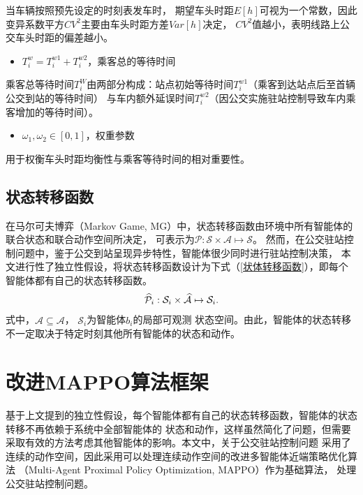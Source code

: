 当车辆按照预先设定的时刻表发车时，
期望车头时距$E[h]$可视为一个常数，因此变异系数平方$CV^2$主要由车头时距方差$Var[h]$决定，
$CV^2$值越小，表明线路上公交车头时距的偏差越小。

\begin{itemize}
    \item $T^w_{i} = T^{w1}_{i} +T^{w2}_{i} $，乘客总的等待时间
\end{itemize}

乘客总等待时间$T^W_{i}$由两部分构成：站点初始等待时间$T^{w1}_{i}$（乘客到达站点后至首辆公交到站的等待时间）
与车内额外延误时间$ T^{w2}_{i}$（因公交实施驻站控制导致车内乘客增加的等待时间）。

\begin{itemize}
    \item $\omega_1,\omega_2 \in [0,1] $，权重参数
\end{itemize}

用于权衡车头时距均衡性与乘客等待时间的相对重要性。

\subsection{状态转移函数}
在马尔可夫博弈（Markov Game, MG）中，状态转移函数由环境中所有智能体的联合状态和联合动作空间所决定，
可表示为$\mathcal{P}:\mathcal{S} \times \mathcal{A} \mapsto \mathcal{S}$。
然而，在公交驻站控制问题中，鉴于公交到站呈现异步特性，智能体很少同时进行驻站控制决策，
本文进行性了独立性假设，将状态转移函数设计为下式（\ref{状体转移函数}），即每个智能体都有自己的状态转移函数。
\begin{equation}\label{状体转移函数}
    \\\widehat{\mathcal{P}}_{i} : \mathcal{S}_{i} \times \widehat{\mathcal{A}}\mapsto \mathcal{S}_{i}.
\end{equation}
式中，$\widehat{\mathcal{A}} \subseteq \mathcal{A}$， $\mathcal{S}_{i}$为智能体$b_i$的局部可观测
状态空间。由此，智能体的状态转移不一定取决于特定时刻其他所有智能体的状态和动作。

\section{改进MAPPO算法框架}
基于上文提到的独立性假设，每个智能体都有自己的状态转移函数，智能体的状态转移不再依赖于系统中全部智能体的
状态和动作，这样虽然简化了问题，但需要采取有效的方法考虑其他智能体的影响。本文中，关于公交驻站控制问题
采用了连续的动作空间，因此采用可以处理连续动作空间的改进多智能体近端策略优化算法
（Multi-Agent Proximal Policy Optimization, MAPPO）作为基础算法，
处理公交驻站控制问题。


